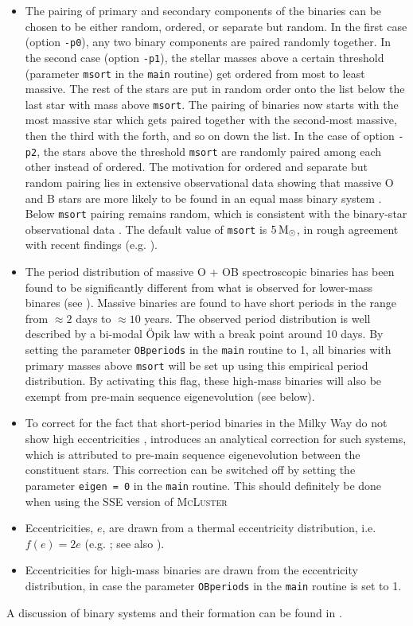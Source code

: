 \documentclass[useAMS,usenatbib]{mn2e}
\newcommand{\msun}{\mbox{$\,{\rm M}_\odot$}}
\begin{document}
\begin{itemize}
\item The pairing of primary and secondary components of the binaries can be chosen to be either random, ordered, or separate but random. In the first case (option \texttt{-p0}), any two binary components are paired randomly together. In the second case (option \texttt{-p1}), the stellar masses above a certain threshold (parameter \texttt{msort} in the \texttt{main} routine) get ordered from most to least massive. The rest of the stars are put in random order onto the list below the last star with mass above \texttt{msort}. The pairing of binaries now starts with the most massive star which gets paired together with the second-most massive, then the third with the forth, and so on down the list. In the case of option \texttt{-p2}, the stars above the threshold \texttt{msort} are randomly paired among each other instead of ordered. The motivation for ordered and separate but random pairing lies in extensive observational data showing that massive O and B stars are more likely to be found in an equal mass binary system \citep{Sana11}. Below \texttt{msort} pairing remains random, which is consistent with the binary-star observational data \citep{Kroupa08}. The default value of \texttt{msort} is $5\msun$, in rough agreement with recent findings (e.g. \citealt{Kobulnicky07}). 
\item The period distribution of massive O + OB spectroscopic binaries has been found to be significantly different from what is observed for lower-mass binares (see \citealt{Sana11}). Massive binaries are found to have short periods in the range from $\approx2$ days to $\approx10$ years. The observed period distribution is well described by a bi-modal \"Opik law with a break point around 10 days. By setting the parameter \texttt{OBperiods} in the \texttt{main} routine to 1, all binaries with primary masses above \texttt{msort} will be set up using this empirical period distribution. By activating this flag, these high-mass binaries will also be exempt from pre-main sequence eigenevolution (see below). 
\item To correct for the fact that short-period binaries in the Milky Way do not show high eccentricities \citep{Mathieu94}, \citet{Kroupa95b} introduces an analytical correction for such systems, which is attributed to pre-main sequence eigenevolution between the constituent stars. This correction can be switched off by setting the parameter \texttt{eigen = 0} in the \texttt{main} routine. This should definitely be done when using the \textsc{SSE} version of \textsc{McLuster}
\item Eccentricities, $e$, are drawn from a thermal eccentricity distribution, i.e. $f(e) = 2e$ (e.g. \citealt{Duquennoy91}; see also \citealt{Kroupa08}).
\item Eccentricities for high-mass binaries are drawn from the \citet{Sana11} eccentricity distribution, in case the parameter \texttt{OBperiods} in the \texttt{main} routine is set to 1.
\end{itemize}
A discussion of binary systems and their formation can be found in \citet{Kroupa09}.
\end{document}
